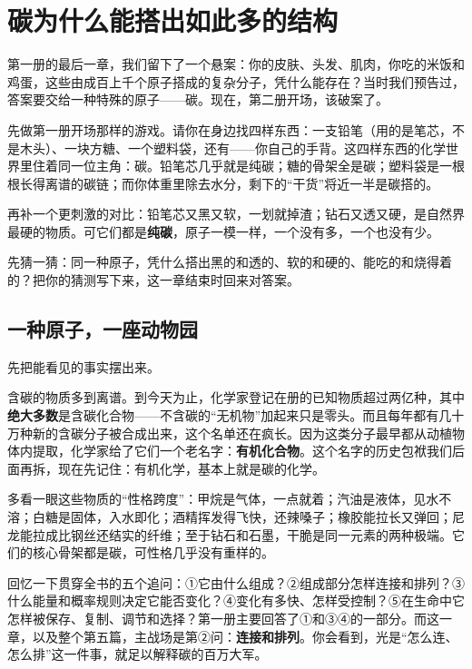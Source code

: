 \chapter{碳为什么能搭出如此多的结构}

\begin{kaichang}
第一册的最后一章，我们留下了一个悬案：你的皮肤、头发、肌肉，你吃的米饭和鸡蛋，这些由成百上千个原子搭成的复杂分子，凭什么能存在？当时我们预告过，答案要交给一种特殊的原子——碳。现在，第二册开场，该破案了。

先做第一册开场那样的游戏。请你在身边找四样东西：一支铅笔（用的是笔芯，不是木头）、一块方糖、一个塑料袋，还有——你自己的手背。这四样东西的化学世界里住着同一位主角：碳。铅笔芯几乎就是纯碳；糖的骨架全是碳；塑料袋是一根根长得离谱的碳链；而你体重里除去水分，剩下的“干货”将近一半是碳搭的。

再补一个更刺激的对比：铅笔芯又黑又软，一划就掉渣；钻石又透又硬，是自然界最硬的物质。可它们都是\textbf{纯碳}，原子一模一样，一个没有多，一个也没有少。

先猜一猜：同一种原子，凭什么搭出黑的和透的、软的和硬的、能吃的和烧得着的？把你的猜测写下来，这一章结束时回来对答案。
\end{kaichang}

\section{一种原子，一座动物园}

先把能看见的事实摆出来。

含碳的物质多到离谱。到今天为止，化学家登记在册的已知物质超过两亿种，其中\textbf{绝大多数}是含碳化合物——不含碳的“无机物”加起来只是零头。而且每年都有几十万种新的含碳分子被合成出来，这个名单还在疯长。因为这类分子最早都从动植物体内提取，化学家给了它们一个老名字：\textbf{有机化合物}。这个名字的历史包袱我们后面再拆，现在先记住：有机化学，基本上就是碳的化学。

多看一眼这些物质的“性格跨度”：甲烷是气体，一点就着；汽油是液体，见水不溶；白糖是固体，入水即化；酒精挥发得飞快，还辣嗓子；橡胶能拉长又弹回；尼龙能拉成比钢丝还结实的纤维；至于钻石和石墨，干脆是同一元素的两种极端。它们的核心骨架都是碳，可性格几乎没有重样的。

回忆一下贯穿全书的五个追问：①它由什么组成？②组成部分怎样连接和排列？③什么能量和概率规则决定它能否变化？④变化有多快、怎样受控制？⑤在生命中它怎样被保存、复制、调节和选择？第一册主要回答了①和③④的一部分。而这一章，以及整个第五篇，主战场是第②问：\textbf{连接和排列}。你会看到，光是“怎么连、怎么排”这一件事，就足以解释碳的百万大军。

